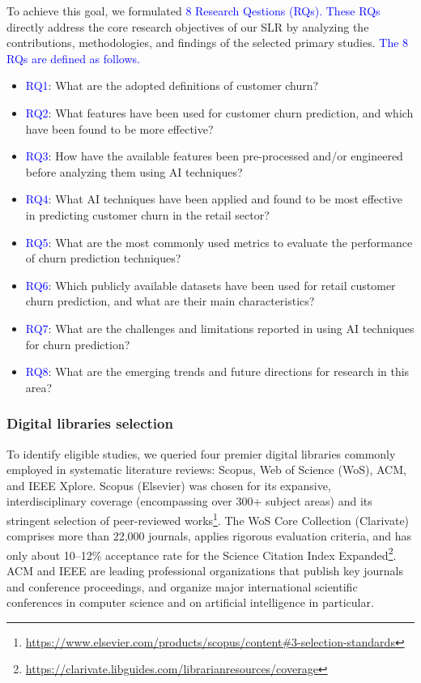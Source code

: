\documentclass[preprint,12pt]{elsarticle}
\newcommand{\PSRQone}{RQ1: How are the primary studies distributed by venue type and publication year?}
\newcommand{\PSRQtwo}{RQ2: What are the venues where the primary studies have been published?}
\newcommand{\PSRQthree}{RQ3: How are primary studies distributed across authors’ affiliation countries?}
\newcommand{\RQlabel}[1]{\textcolor{blue}{#1}}
\newcommand{\RSRQone}{\RQlabel{RQ1}: What are the adopted definitions of customer churn?}
\newcommand{\RSRQtwo}{\RQlabel{RQ2}: What features have been used for customer churn prediction, and which have been found to be more effective?}
\newcommand{\RSRQthree}{\RQlabel{RQ3}: How have the available features been pre-processed and/or engineered before analyzing them using AI techniques?}
\newcommand{\RSRQfour}{\RQlabel{RQ4}: What AI techniques have been applied and found to be most effective in predicting customer churn in the retail sector?}
\newcommand{\RSRQfive}{\RQlabel{RQ5}: What are the most commonly used metrics to evaluate the performance of churn prediction techniques?}
\newcommand{\RSRQsix}{\RQlabel{RQ6}: Which publicly available datasets have been used for retail customer churn prediction, and what are their main characteristics?}
\newcommand{\RSRQseven}{\RQlabel{RQ7}: What are the challenges and limitations reported in using AI techniques for churn prediction?}
\newcommand{\RSRQeight}{\RQlabel{RQ8}: What are the emerging trends and future directions for research in this area?}
\begin{document}
To achieve this goal, we formulated \textcolor{blue}{8 Research Qestions (RQs). These RQs} directly address the core research objectives of our SLR by analyzing the contributions, methodologies, and findings of the selected primary studies. \textcolor{blue}{The 8 RQs are defined as follows.} %

\begin{itemize}[label={}, itemsep=1pt, parsep=0pt, topsep=0pt]
    \item \RSRQone
    \item \RSRQtwo
    \item \RSRQthree
    \item \RSRQfour
    \item \RSRQfive
    \item \RSRQsix
    \item \RSRQseven
    \item \RSRQeight
\end{itemize}

\subsubsection{Digital libraries selection} 
To identify eligible studies, we queried four premier digital libraries commonly employed in systematic literature reviews: Scopus, Web of Science (WoS), ACM, and IEEE Xplore. Scopus (Elsevier) was chosen for its expansive, interdisciplinary coverage (encompassing over 300+ subject areas) and its stringent selection of peer-reviewed works\footnote{\url{https://www.elsevier.com/products/scopus/content\#3-selection-standards}}. The WoS Core Collection (Clarivate) comprises more than 22,000 journals, applies rigorous evaluation criteria, and has only about 10–12\% acceptance rate for the Science Citation Index Expanded\footnote{\url{https://clarivate.libguides.com/librarianresources/coverage}}. ACM and IEEE are leading professional organizations that publish key journals and conference proceedings, and organize major international scientific conferences in computer science and on artificial intelligence in particular.
\end{document}
